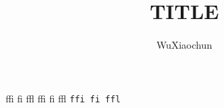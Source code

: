 ﻿\documentclass[a4paper,onecolumn]{article}
\title{TITLE}
\author{WuXiaochun}
\date{}
\begin{document}
ffi fi ffl
\textsf{ffi fi ffl}
\texttt{ffi fi ffl}
\end{document}
